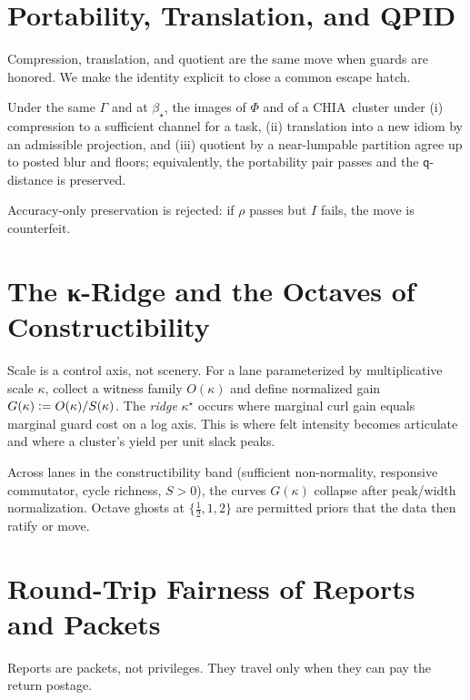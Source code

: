 \documentclass[11pt]{article}
\newcommand{\1}{\mathbf{1}}
\newcommand{\defeq}{\vcentcolon=}
\newcommand{\Guard}{\Gamma}
\newcommand{\ratio}{\rho}
\newcommand{\rate}{I}
\newcommand{\Slack}{S}
\newcommand{\Blur}{\beta}
\newcommand{\PhiField}{\Phi}
\newcommand{\Qualon}{\mathsf{q}}        %
\newcommand{\CHIA}{\textsc{CHIA}}
\newcommand{\QPID}{\textsc{QPID}}   %
\begin{document}
\section{Portability, Translation, and \QPID}
Compression, translation, and quotient are the same move when guards are honored. We make the identity explicit to close a common escape hatch.

\begin{thm}\label{thm:QPID}
Under the same \(\Guard\) and at \(\Blur_\star\), the images of \(\PhiField\) and of a \CHIA\ cluster under (i) compression to a sufficient channel for a task, (ii) translation into a new idiom by an admissible projection, and (iii) quotient by a near-lumpable partition agree up to posted blur and floors; equivalently, the portability pair passes and the \(\Qualon\)-distance is preserved.
\end{thm}
\begin{remark}
Accuracy-only preservation is rejected: if \(\ratio\) passes but \(\rate\) fails, the move is counterfeit. 
\end{remark}

\section{The κ-Ridge and the Octaves of Constructibility}\label{sec:kappa}
Scale is a control axis, not scenery. For a lane parameterized by multiplicative scale \(\kappa\), collect a witness family \(O(\kappa)\) and define normalized gain \(G(\kappa)\defeq O(\kappa)/\Slack(\kappa)\). The \emph{ridge} \(\kappa^\star\) occurs where marginal curl gain equals marginal guard cost on a log axis. This is where felt intensity becomes articulate and where a cluster's yield per unit slack peaks.

\begin{claim}
Across lanes in the constructibility band (sufficient non-normality, responsive commutator, cycle richness, \(\Slack>0\)), the curves \(G(\kappa)\) collapse after peak/width normalization. Octave ghosts at \(\{\tfrac12,1,2\}\) are permitted priors that the data then ratify or move.
\end{claim}

\section{Round-Trip Fairness of Reports and Packets}
Reports are packets, not privileges. They travel only when they can pay the return postage.
\end{document}

